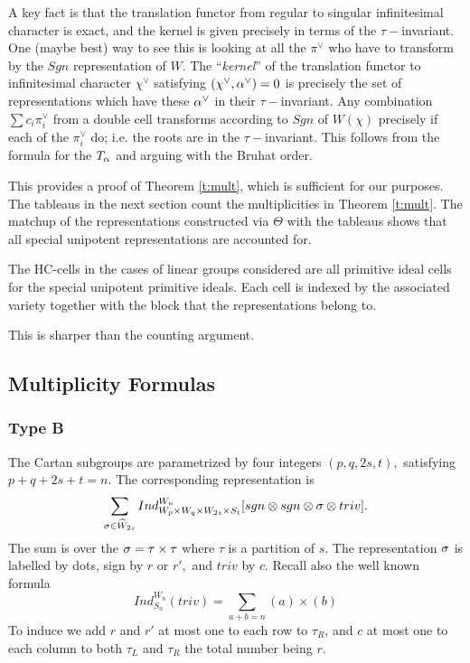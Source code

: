 \documentclass[11pt ,reqno]{amsart}
\begin{document}
A key fact is that the translation functor
from regular to singular infinitesimal character is exact, and the
kernel is given precisely in terms of the $\tau-$invariant. One 
(maybe best) way to see this is looking at all the $\pi^\vee$ who
have to transform by the $Sgn$ representation of $W$. The
``\textit{kernel}'' of the translation functor to infinitesimal
character $\chi^\vee$ satisfying $(\chi^\vee,{\alpha}^\vee)=0$ is precisely the set of
representations which have these ${\alpha}^\vee$ in their
$\tau-$invariant. Any combination $\sum c_i\pi_i^\vee$ from a double
cell transforms according to $Sgn$ of $W(\chi)$ precisely if each of the $\pi_i^\vee$ do; i.e. the
roots are in the $\tau-$invariant. This follows from the formula for
the $T_{\alpha}$ and arguing with the Bruhat order. 


This provides a proof of Theorem \ref{t:mult}, which
is sufficient for our purposes. The tableaus in the next section count
the multiplicities in Theorem \ref{t:mult}. The matchup of the representations
constructed via $\Theta$ with the tableaus shows that all special
unipotent representations are accounted for. 

\begin{conjecture}
The HC-cells in the cases of linear groups considered are all primitive
ideal   cells for the special unipotent primitive ideals. Each cell is
indexed by the associated variety together with the block that the
representations belong to. 
\end{conjecture}
This is sharper than the counting argument. 
\newpage










\subsection{Multiplicity Formulas}
\subsubsection{Type B}\label{2.1} The Cartan subgroups are parametrized by
four integers $(p,q,2s,t),$ satisfying $p+q+2s+t=n.$ The corresponding
representation is 
\begin{equation}
\sum_{{\sigma}\in\widehat{W}_{2s}}Ind_{W_p\times W_q\times W_{2s}\times S_t}^{W_n}
[sgn\otimes sgn\otimes{\sigma}\otimes triv].
\end{equation}
The sum is over the ${\sigma}=\tau\times\tau$ where $\tau$ is a partition
of $s.$ 
The representation ${\sigma}$ is labelled by dots, sign by $r$ or $r',$ and $triv$
by $c.$ Recall also the well known formula
\begin{equation}
Ind_{S_n}^{W_n}(triv)=\sum_{a+b=n} (a)\times(b)
\label{2.1.1}\end{equation}
To induce we add $r$ and $r'$ at most one to each row to $\tau_R$, and
$c$ at most one to each column to both $\tau_L$ and $\tau_R$ the total
number being $r$.
\end{document}
